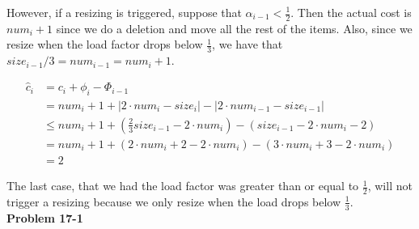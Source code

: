 \documentclass{article}
\begin{document}
However, if a resizing is triggered, suppose that $\alpha_{i-1} <\frac{1}{2}$. Then the actual cost is $num_i+1$ since we do a deletion and move all the rest of the items. Also, since we resize when the load factor drops below $\frac{1}{3}$, we have that $size_{i-1}/3 = num_{i-1} = num_i +1$.

\begin{align*}
\hat{c}_i &= c_i + \phi_i - \Phi_{i-1}\\
&= num_i + 1 + |2\cdot num_i -size_i| - |2\cdot num_{i-1} - size_{i-1}|\\
&\le num_i + 1 + \left(\frac{2}{3}size_{i-1}- 2\cdot num_i\right) - (size_{i-1} - 2\cdot num_i -2 ) \\
&=num_i + 1 + (2\cdot num_i +2 - 2\cdot num_i) - (3\cdot num_i +3 -2\cdot num_i)\\
&= 2
\end{align*}

The last case, that we had the load factor was greater than or equal to $\frac{1}{2}$, will not trigger a resizing because we only resize when the load drops below $\frac{1}{3}$.\\

\noindent\textbf{Problem 17-1}\\
\end{document}
